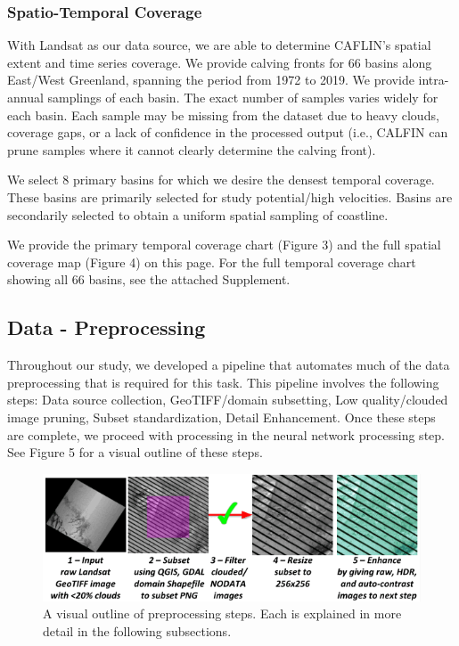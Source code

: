 \documentclass[tc, manuscript]{copernicus}
\begin{document}
\subsubsection{Spatio-Temporal Coverage}
With Landsat as our data source, we are able to determine CAFLIN's spatial extent and time series coverage. We provide calving fronts for 66 basins along East/West Greenland, spanning the period from 1972 to 2019. We provide intra-annual samplings of each basin. The exact number of samples varies widely for each basin. Each sample may be missing from the dataset due to heavy clouds, coverage gaps, or a lack of confidence in the processed output (i.e., CALFIN can prune samples where it cannot clearly determine the calving front). 

We select 8 primary basins for which we desire the densest temporal coverage. These basins are primarily selected for study potential/high velocities. Basins are secondarily selected to obtain a uniform spatial sampling of coastline.

We provide the primary temporal coverage chart (Figure 3) and the full spatial coverage map (Figure 4) on this page. For the full temporal coverage chart showing all 66 basins, see the attached Supplement.

\subsection{Data - Preprocessing}
Throughout our study, we developed a pipeline that automates much of the data preprocessing that is required for this task. This pipeline involves the following steps: Data source collection, GeoTIFF/domain subsetting, Low quality/clouded image pruning, Subset standardization, Detail Enhancement.
Once these steps are complete, we proceed with processing in the neural network processing step. See Figure 5 for a visual outline of these steps.


\begin{figure}[t]
\includegraphics[width=14cm]{pipeline-preprocess.png}
\centering
\caption{A visual outline of preprocessing steps. Each is explained in more detail in the following subsections.}
\end{figure}
\end{document}
